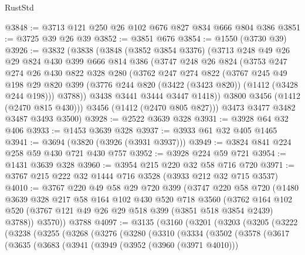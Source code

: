 \begin{lexlean}{RustStd}
\begin{coremodule}
{\begin{coremodule}
{{{{{{{{{{@3848 := @3713 @121 @250 @26 @102 @676 @827 @834 @666 @804 @386
@3851 := @3725 @39 @26 @39
@3852 := @3851 @676
@3854 := @1550 (@3730 @39)
@3926 := @3832
    (@3838
      (@3848
        (@3852 @3854 @3376)
        (@3713
          @248
          @49
          @26
          @29
          @824
          @430
          @399
          @666
          @814
          @386
          (@3747
            @248
            @26
            @824
            (@3753
              @247
              @274
              @26
              @430
              @822
              @328
              @280
              (@3762
                @247
                @274
                @822
                (@3767
                  @245
                  @49
                  @198
                  @29
                  @820
                  @399
                  (@3776 @244 @820 (@3422 (@3423 @820)) (@1412 (@3428 @244 @198)))
                  @3788))
              @3438
              @3441
              @3444
              @3447
              @1418))
          @3800
          @3456
          (@1412 (@2470 @815 @430)))
        @3456
        (@1412 (@2470 @805 @827)))
      @3473
      @3477
      @3482
      @3487
      @3493
      @3500)
@3928 := @2522 @3639 @328
@3931 := @3928 @64 @32 @406
@3933 := @1453 @3639 @328
@3937 := @3933 @61 @32 @405 @1465
@3941 := @3694 (@3820 (@3926 (@3931 @3937)))
@3949 := @3824 @841 @224 @258 @59 @430 @721 @430 @757
@3952 := @3928 @224 @59 @721
@3954 := @1431 @3639 @328
@3960 := @3954 @215 @220 @32 @58 @716 @720
@3971 := @3767 @215 @222 @32 @1444 @716 @3528 (@3933 @212 @32 @715 @3537)
@4010 := @3767
    @220
    @49
    @58
    @29
    @720
    @399
    (@3747
      @220
      @58
      @720
      (@1480
        @3639
        @328
        @217
        @58
        @164
        @102
        @430
        @520
        @718
        @3560
        (@3762 @164 @102 @520 (@3767 @121 @49 @26 @29 @518 @399 (@3851 @518 @3854 @2439) @3788))
        @3570))
    @3788
@4097 := @3135
    (@3160
      (@3201
        (@3203
          (@3205
            (@3222
              (@3238
                (@3255
                  (@3268
                    (@3276
                      (@3280
                        (@3310
                          (@3334
                            (@3502
                              (@3578
                                (@3617
                                  (@3635
                                    (@3683
                                      (@3941
                                        (@3949
                                          (@3952 (@3960 (@3971 @4010)))
}}}}}}}}}}
\end{coremodule}}
\end{coremodule}
\end{lexlean}
